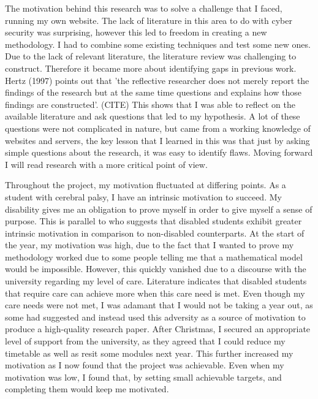

The motivation behind this research was to solve a challenge that I faced, running my own website. The lack of literature in this area to do with cyber security was surprising, however this led to freedom in creating a new methodology. I had to combine some existing techniques and test some new ones. Due to the lack of relevant literature, the literature review was challenging to construct. Therefore it became more about identifying gaps in previous work. Hertz (1997) points out that 'the reflective researcher does not merely report the findings of the research but at the same time questions and explains how those findings are constructed'. (CITE) This shows that I was able to reflect on the available literature and ask questions that led to my hypothesis. A lot of these questions were not complicated in nature, but came from a working knowledge of websites and servers, the key lesson that I learned in this was that just by asking simple questions about the research, it was easy to identify flaws. Moving forward I will read research with a more critical point of view.

Throughout the project, my motivation fluctuated at differing points. As a student with cerebral palsy, I have an intrinsic motivation to succeed. My disability gives  me an obligation to prove myself in order to give myself a sense of purpose. This is parallel to \cite{bye2007motivation} who suggests that disabled students exhibit greater intrinsic motivation in comparison to non-disabled counterparts. At the start of the year, my motivation was high, due to the fact that I wanted to prove my methodology worked due to some people telling me that a mathematical model would be impossible. However, this quickly vanished due to a discourse with the university regarding my level of care. Literature indicates that disabled students that require care can achieve more when this care need is met. Even though my care needs were not met, I was adamant that I would not be taking a year out, as some had suggested and instead used this adversity as a source of motivation to produce a high-quality research paper. After Christmas, I secured an appropriate level of support from the university, as they agreed that I could reduce my timetable as well as resit some modules next year. This further increased my motivation as I now found that the project was achievable. Even when my motivation was low, I found that, by setting small achievable targets, and completing them would keep me motivated.